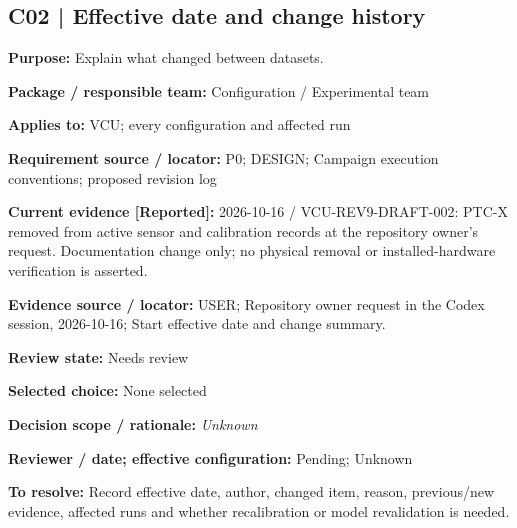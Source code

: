 \documentclass[11pt]{article}
\begin{document}
\par\noindent\begin{minipage}{\textwidth}\small\setlength{\parskip}{2pt}
\subsection*{C02 | Effective date and change history}
\textbf{Purpose:} Explain what changed between datasets.\par
\textbf{Package / responsible team:} Configuration / Experimental team\par
\textbf{Applies to:} VCU; every configuration and affected run\par
\textbf{Requirement source / locator:} P0; DESIGN; Campaign execution conventions; proposed revision log\par
\textbf{Current evidence [Reported]:} 2026-10-16 / VCU-REV9-DRAFT-002: PTC-X removed from active sensor and calibration records at the repository owner's request. Documentation change only; no physical removal or installed-hardware verification is asserted.\par
\textbf{Evidence source / locator:} USER; Repository owner request in the Codex session, 2026-10-16; Start effective date and change summary.\par
\textbf{Review state:} Needs review\par
\textbf{Selected choice:} None selected\par
\textbf{Decision scope / rationale:} \textit{Unknown}\par
\textbf{Reviewer / date; effective configuration:} Pending; Unknown\par
\textbf{To resolve:} Record effective date, author, changed item, reason, previous/new evidence, affected runs and whether recalibration or model revalidation is needed.\par
\end{minipage}\par\vspace{5pt}
\end{document}
